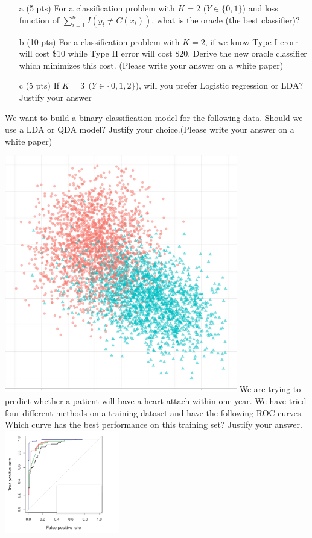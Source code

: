 \documentclass[11pt,answers,addpoints]{exam}
\begin{document}
\begin{questions}


\question \begin{itemize}
    \item[a] (5 pts) For a classification problem with $K = 2$ ($Y \in \{0, 1\}$) and loss function of $\sum_{i = 1}^n I(y_i \neq C(x_i))$, what is the oracle (the best classifier)?
    \item[b] (10 pts) For a classification problem with $K = 2$, if we know Type I erorr will cost \$10 while Type II error will cost \$20. Derive the new oracle classifier which minimizes this cost. (Please write your answer on a white paper)
    \item[c] (5 pts) If $K = 3 \ \ (Y \in \{0, 1, 2 \}$), will you prefer Logistic regression or LDA? Justify your answer
\end{itemize}
\vspace{3in}

\newpage
\question[10] We want to build a binary classification model for the following data. Should we use a LDA or QDA model? Justify your choice.(Please write your answer on a white paper)

\includegraphics[scale=2]{fig1.png}
\vspace{2in}
\question[5] We are trying to predict whether a patient will have a heart attach within one year. We have tried four different methods on a training dataset and have the following ROC curves. Which curve has the best performance on this training set? Justify your answer.\\
\includegraphics[width=5cm]{./Picture3.png}


\end{questions}
\end{document}
